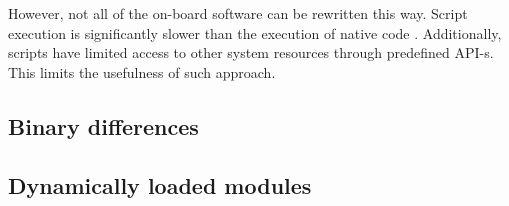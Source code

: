However, not all of the on-board software can be rewritten this way. Script execution is significantly slower than the execution of native code . Additionally, scripts have limited access to other system resources through predefined API-s. This limits the usefulness of such approach.


\subsection{Binary differences}

\subsection{Dynamically loaded modules}



